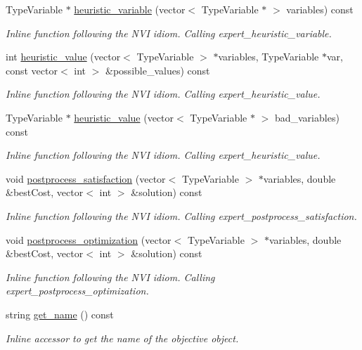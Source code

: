 \begin{DoxyCompactItemize}
Type\-Variable $\ast$ \hyperlink{classghost_1_1Objective_a25d0680bd9a49997c6122cf3ef921900}{heuristic\-\_\-variable} (vector$<$ Type\-Variable $\ast$ $>$ variables) const 
\begin{DoxyCompactList}\small\item\em Inline function following the N\-V\-I idiom. Calling expert\-\_\-heuristic\-\_\-variable. \end{DoxyCompactList}\item 
int \hyperlink{classghost_1_1Objective_ab9ed9b882b8e865d20eeae168001561a}{heuristic\-\_\-value} (vector$<$ Type\-Variable $>$ $\ast$variables, Type\-Variable $\ast$var, const vector$<$ int $>$ \&possible\-\_\-values) const 
\begin{DoxyCompactList}\small\item\em Inline function following the N\-V\-I idiom. Calling expert\-\_\-heuristic\-\_\-value. \end{DoxyCompactList}\item 
Type\-Variable $\ast$ \hyperlink{classghost_1_1Objective_ab52e4a66ce78c9477ef44b2d8dde57e6}{heuristic\-\_\-value} (vector$<$ Type\-Variable $\ast$ $>$ bad\-\_\-variables) const 
\begin{DoxyCompactList}\small\item\em Inline function following the N\-V\-I idiom. Calling expert\-\_\-heuristic\-\_\-value. \end{DoxyCompactList}\item 
void \hyperlink{classghost_1_1Objective_a953abf257ee236e934011754edada4a9}{postprocess\-\_\-satisfaction} (vector$<$ Type\-Variable $>$ $\ast$variables, double \&best\-Cost, vector$<$ int $>$ \&solution) const 
\begin{DoxyCompactList}\small\item\em Inline function following the N\-V\-I idiom. Calling expert\-\_\-postprocess\-\_\-satisfaction. \end{DoxyCompactList}\item 
void \hyperlink{classghost_1_1Objective_ae9e095cabcd99b2b0a7b1861ecf4ca20}{postprocess\-\_\-optimization} (vector$<$ Type\-Variable $>$ $\ast$variables, double \&best\-Cost, vector$<$ int $>$ \&solution) const 
\begin{DoxyCompactList}\small\item\em Inline function following the N\-V\-I idiom. Calling expert\-\_\-postprocess\-\_\-optimization. \end{DoxyCompactList}\item 
string \hyperlink{classghost_1_1Objective_aeb2af94526fac09e2c4242817b22ef09}{get\-\_\-name} () const 
\begin{DoxyCompactList}\small\item\em Inline accessor to get the name of the objective object. \end{DoxyCompactList}\end{DoxyCompactItemize}

